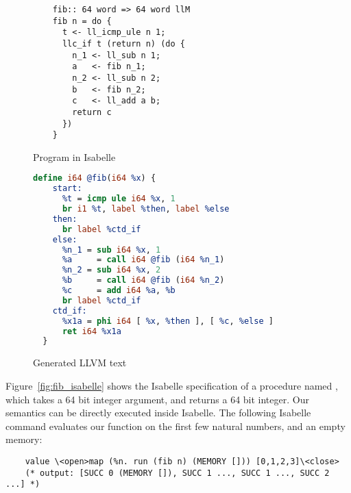 \documentclass[a4paper,oribibl,envcountsame]{llncs}
\begin{document}
\begin{figure}
\centering
\begin{minipage}[t]{.39\textwidth}
  \begin{lstlisting}
    fib:: 64 word => 64 word llM
    fib n = do {
      t <- ll_icmp_ule n 1;
      llc_if t (return n) (do {
        n_1 <- ll_sub n 1;
        a   <- fib n_1;
        n_2 <- ll_sub n 2;
        b   <- fib n_2;
        c   <- ll_add a b;
        return c
      })
    }    
  \end{lstlisting}
  \caption{Program in Isabelle}\label{fig:fib_isabelle}
\end{minipage}
\hspace*{.09\textwidth}
\begin{minipage}[t]{.5\textwidth}
  \begin{lstlisting}[language=LLVM, literate={}]
  define i64 @fib(i64 %x) {
    start:
      %t = icmp ule i64 %x, 1
      br i1 %t, label %then, label %else
    then:
      br label %ctd_if
    else:
      %n_1 = sub i64 %x, 1
      %a     = call i64 @fib (i64 %n_1)
      %n_2 = sub i64 %x, 2
      %b     = call i64 @fib (i64 %n_2)
      %c     = add i64 %a, %b
      br label %ctd_if
    ctd_if:
      %x1a = phi i64 [ %x, %then ], [ %c, %else ]
      ret i64 %x1a
  }  
  \end{lstlisting}
  \caption{Generated LLVM text}\label{fig:fib_llvm}
\end{minipage}
\end{figure}

\begin{example}\label{ex:fib_isabelle}
  Figure~\ref{fig:fib_isabelle} shows the Isabelle specification of a procedure named , 
  which takes a 64 bit integer argument, and returns a 64 bit integer. 
  Our semantics can be directly executed inside Isabelle. The following Isabelle command evaluates our function on the first few natural numbers, and an empty memory:
  \begin{lstlisting}
    value \<open>map (%n. run (fib n) (MEMORY [])) [0,1,2,3]\<close>
    (* output: [SUCC 0 (MEMORY []), SUCC 1 ..., SUCC 1 ..., SUCC 2 ...] *)
  \end{lstlisting}
\end{example}
\end{document}

